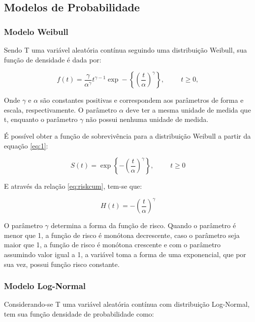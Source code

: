 \subsection*{Modelos de Probabilidade}

\subsubsection*{Modelo Weibull}
Sendo T uma variável aleatória contínua seguindo uma distribuição Weibull, sua função de densidade é dada por:

$$ f(t) = \dfrac{\gamma}{\alpha^{\gamma}}t^{\gamma-1}\exp-\left\lbrace\left(\dfrac{t}{\alpha}\right)^{\gamma}\right\rbrace, \hspace{1cm} t \ge 0,$$

Onde $\gamma$ e $\alpha$ são constantes positivas e correspondem aos parâmetros de forma e escala, respectivamente. O parâmetro $\alpha$ deve ter a mesma unidade de medida que t, enquanto o parâmetro $\gamma$ não possui nenhuma unidade de medida.

É possível obter a função de sobrevivência para a distribuição Weibull a partir da equação \ref{eq:1}:

\begin{equation} \label{eq:WeiHaz}
S(t) = \exp \left\lbrace - \left( \dfrac{t}{\alpha} \right)^{\gamma} \right\rbrace, \hspace{1cm} t \ge 0
\end{equation}

E através da relação \ref{eq:riskcum}, tem-se que:

\begin{equation} \label{eq:WeRis}
	H(t) = - \left( \dfrac{t}{\alpha} \right)^{\gamma}
\end{equation}

O parâmetro $\gamma$ determina a forma da função de risco. Quando o parâmetro é menor que 1, a função de risco é monótona decrescente, caso o parâmetro seja maior que 1, a função de risco é monótona crescente e com o parâmetro assumindo valor igual a 1, a variável toma a forma de uma exponencial, que por sua vez, possui função risco constante.

\subsubsection*{Modelo Log-Normal}

Considerando-se T uma variável aleatória contínua com distribuição Log-Normal, tem sua função densidade de probabilidade como:

